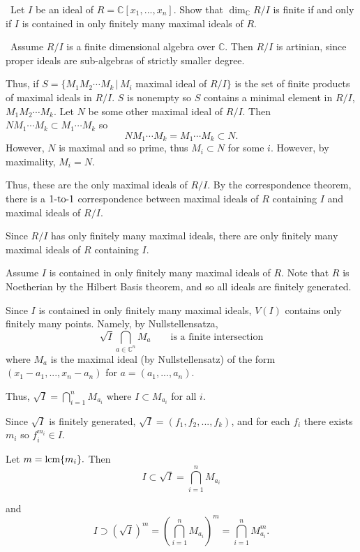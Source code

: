 \documentclass[12pt]{Qual}
\begin{document}
\begin{problem} $\,$
Let $I$ be an ideal of $R=\mathbb{C}[x_1,...,x_n]$. Show that $\dim_\mathbb{C}R/I$ is finite if and only if $I$ is contained in only finitely many maximal ideals of $R.$
\end{problem}


\begin{solution}$\,$
\boxed{\implies} Assume $R/I$ is a finite dimensional algebra over $\mathbb{C}$. Then $R/I$ is artinian, since proper ideals are sub-algebras of strictly smaller degree.

Thus, if $S=\{M_1M_2\cdots M_k\,|\, M_i$ maximal ideal of $R/I\}$ is the set of finite products of maximal ideals in $R/I$. $S$ is nonempty so $S$ contains a minimal element in $R/I$, $M_1M_2\cdots M_k$. Let $N$ be some other maximal ideal of $R/I$. Then $NM_1\cdots M_k\subset M_1\cdots M_k$ so $$NM_1\cdots M_k= M_1\cdots M_k\subset N.$$ However, $N$ is maximal and so prime, thus $M_i\subset N$ for some $i$. However, by maximality, $M_i=N$.

Thus, these are the only maximal ideals of $R/I$. By the correspondence theorem, there is a $1\text{-to-}1$ correspondence between maximal ideals of $R$ containing $I$ and maximal ideals of $R/I$.

Since $R/I$ has only finitely many maximal ideals, there are only finitely many maximal ideals of $R$ containing $I.$

\boxed{\impliedby} Assume $I$ is contained in only finitely many maximal ideals of $R$. Note that $R$ is Noetherian by the Hilbert Basis theorem, and so all ideals are finitely generated.

Since $I$ is contained in only finitely many maximal ideals, $V(I)$ contains only finitely many points. Namely, by Nullstellensatza, $$\sqrt{I}\bigcap_{a\in\mathbb{C}^n}M_a\qquad \text{is a finite intersection}$$ where $M_a$ is the maximal ideal (by Nullstellensatz) of the form $(x_1-a_1,...,x_n-a_n)$ for $a=(a_1,...,a_n)$.

Thus, $\sqrt{I}=\bigcap_{i=1}^nM_{a_i}$ where $I\subset M_{a_i}$ for all $i$.

Since $\sqrt{I}$ is finitely generated, $\sqrt{I}=(f_1,f_2,...,f_k)$, and for each $f_i$ there exists $m_i$ so $f_i^{m_i}\in I$.

Let $m=\text{lcm}\{m_i\}.$ Then $$I\subset\sqrt{I}=\bigcap_{i=1}^nM_{a_i}$$

and $$I\supset (\sqrt{I})^m=\left(\bigcap_{i=1}^nM_{a_i}\right)^m=\bigcap_{i=1}^nM_{a_i}^m.$$


\end{solution}
\end{document}
